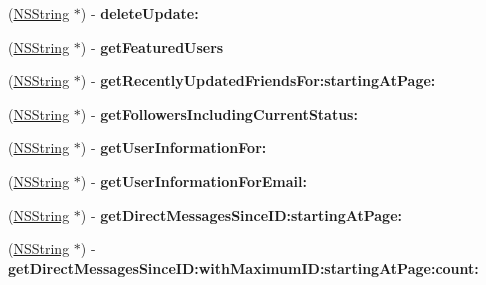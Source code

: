 \begin{DoxyCompactItemize}
\item 
\hypertarget{interface_m_g_twitter_engine_af3ce91314c877fff26c166f2e807697d}{
(\hyperlink{class_n_s_string}{\-N\-S\-String} $\ast$) -\/ {\bfseries delete\-Update\-:}}
\label{interface_m_g_twitter_engine_af3ce91314c877fff26c166f2e807697d}

\item 
\hypertarget{interface_m_g_twitter_engine_ae2ab1bbd18e796c760872ee397a75f34}{
(\hyperlink{class_n_s_string}{\-N\-S\-String} $\ast$) -\/ {\bfseries get\-Featured\-Users}}
\label{interface_m_g_twitter_engine_ae2ab1bbd18e796c760872ee397a75f34}

\item 
\hypertarget{interface_m_g_twitter_engine_a3f2e3bf40f1dcad75692d514858d2150}{
(\hyperlink{class_n_s_string}{\-N\-S\-String} $\ast$) -\/ {\bfseries get\-Recently\-Updated\-Friends\-For\-:starting\-At\-Page\-:}}
\label{interface_m_g_twitter_engine_a3f2e3bf40f1dcad75692d514858d2150}

\item 
\hypertarget{interface_m_g_twitter_engine_a4979c32666cd336144161e39bcd0ab64}{
(\hyperlink{class_n_s_string}{\-N\-S\-String} $\ast$) -\/ {\bfseries get\-Followers\-Including\-Current\-Status\-:}}
\label{interface_m_g_twitter_engine_a4979c32666cd336144161e39bcd0ab64}

\item 
\hypertarget{interface_m_g_twitter_engine_a5deec57286dc7d6ad98424ee2d8ae849}{
(\hyperlink{class_n_s_string}{\-N\-S\-String} $\ast$) -\/ {\bfseries get\-User\-Information\-For\-:}}
\label{interface_m_g_twitter_engine_a5deec57286dc7d6ad98424ee2d8ae849}

\item 
\hypertarget{interface_m_g_twitter_engine_a0846bbf1ad1664a885fe9015d7243735}{
(\hyperlink{class_n_s_string}{\-N\-S\-String} $\ast$) -\/ {\bfseries get\-User\-Information\-For\-Email\-:}}
\label{interface_m_g_twitter_engine_a0846bbf1ad1664a885fe9015d7243735}

\item 
\hypertarget{interface_m_g_twitter_engine_aaf576a2b307d113b22922bf8f10dfb7e}{
(\hyperlink{class_n_s_string}{\-N\-S\-String} $\ast$) -\/ {\bfseries get\-Direct\-Messages\-Since\-I\-D\-:starting\-At\-Page\-:}}
\label{interface_m_g_twitter_engine_aaf576a2b307d113b22922bf8f10dfb7e}

\item 
\hypertarget{interface_m_g_twitter_engine_ad140175bf45e9d41001edf80390e850f}{
(\hyperlink{class_n_s_string}{\-N\-S\-String} $\ast$) -\/ {\bfseries get\-Direct\-Messages\-Since\-I\-D\-:with\-Maximum\-I\-D\-:starting\-At\-Page\-:count\-:}}
\label{interface_m_g_twitter_engine_ad140175bf45e9d41001edf80390e850f}


\end{DoxyCompactItemize}
